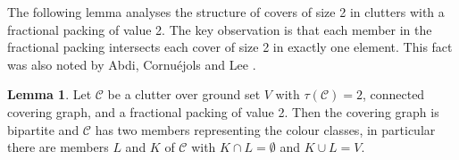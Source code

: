 \documentclass[a4paper, 12pt]{scrbook}
\theoremstyle{definition}
\newtheorem{lemma}[theorem]{Lemma}
\begin{document}
    \begin{figure}[h]
        \centering
        \begin{minipage}{.4\textwidth}
            \centering
            \label{cg6}
        \end{minipage}
        \begin{minipage}{.5\textwidth}
            \centering
            \label{cg5}
        \end{minipage}
    \end{figure}

    The following lemma analyses the structure of covers of size 2 in clutters with a fractional packing of value 2.
    The key observation is that each member in the fractional packing intersects each cover of size 2 in exactly one element.
    This fact was also noted by Abdi, Cornuéjols and Lee \cite{ideal}.

   \begin{lemma}\label{bipartite}
       Let $\mathcal{C}$ be a clutter over ground set $V$ with $\tau(\mathcal{C})=2$, connected covering graph, and a fractional packing of value 2.
       Then the covering graph is bipartite and $\mathcal{C}$ has two members representing the colour classes, in particular there are members $L$ and $K$ of $\mathcal{C}$ with $K \cap L = \emptyset$ and $K \cup L = V$.
   \end{lemma}
\end{document}
